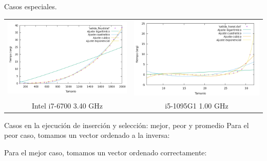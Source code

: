 \documentclass[10pt, xcolor=table]{beamer}
\begin{document}
\begin{frame}[fragile]{Casos especiales.
}
\centering
\begin{tabular}{cc}
\includegraphics[scale=0.2]{../../Images/floy_comparacion.png}
&
\includegraphics[scale=0.2]{../../Images/hanoi_comparacion.png}
\\
Intel i7-6700 3.40 GHz & i5-1095G1 1.00 GHz
\end{tabular}
\end{frame}

\begin{frame}{Casos en la ejecución de inserción y selección: mejor, peor y promedio}
	Para el peor caso, tomamos un vector ordenado a la inversa:
	
	Para el mejor caso, tomamos un vector ordenado correctamente:
	
	
\end{frame}
\end{document}
